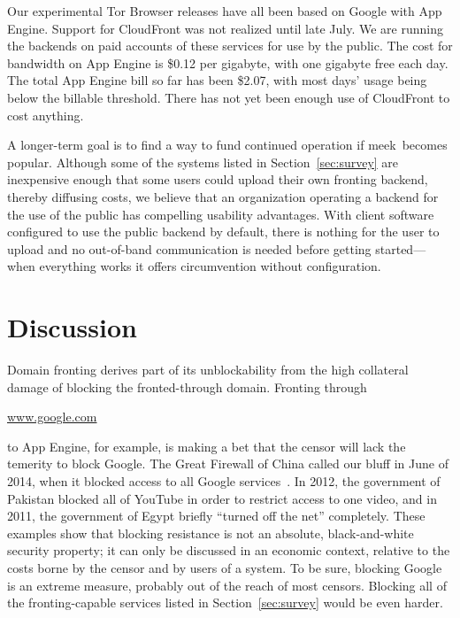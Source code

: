 \documentclass[conference]{IEEEtran}
\newcommand{\meek}{meek\xspace}
\def\urll#1{\begin{NoHyper}\url{#1}\end{NoHyper}}
\begin{document}
Our experimental Tor Browser releases have all been based on Google with App Engine.
Support for CloudFront was not realized until late July.
We are running the backends on paid accounts of these services for use by the public.
The cost for bandwidth on App Engine is \$0.12 per gigabyte,
with one gigabyte free each day.
The total App Engine bill so far has been \$2.07,
with most days' usage being below the billable threshold.
There has not yet been enough use of CloudFront to cost anything.

A longer-term goal is to find a way to fund continued operation
if \meek\ becomes popular.
Although some of the systems listed in Section~\ref{sec:survey}
are inexpensive enough that some users could upload their own fronting backend,
thereby diffusing costs,
we believe that an organization operating a backend for the use of the public
has compelling usability advantages.
With client software configured to use the public backend by default,
there is nothing for the user to upload and no out-of-band communication is needed before getting
started---when everything works it offers circumvention without configuration.


\section{Discussion}
\label{sec:discussion}

Domain fronting derives part of its unblockability from the
high collateral damage of blocking the fronted-through domain.
Fronting through \urll{www.google.com} to App Engine, for example,
is making a bet that the censor will lack the temerity to block Google.
The Great Firewall of China called our bluff in June of 2014,
when it blocked access to all Google services~\cite{cn-google-block}.
In 2012, the government of Pakistan blocked all of YouTube
in order to restrict access to one video,
and in 2011, the government of Egypt briefly ``turned off the net'' completely.
These examples show that blocking resistance is not an absolute,
black-and-white security property;
it can only be discussed in an economic context, relative to the costs borne
by the censor and by users of a system.
To be sure, blocking Google is an extreme measure,
probably out of the reach of most censors.
Blocking all of the fronting-capable services listed in
Section~\ref{sec:survey} would be even harder.
\end{document}
